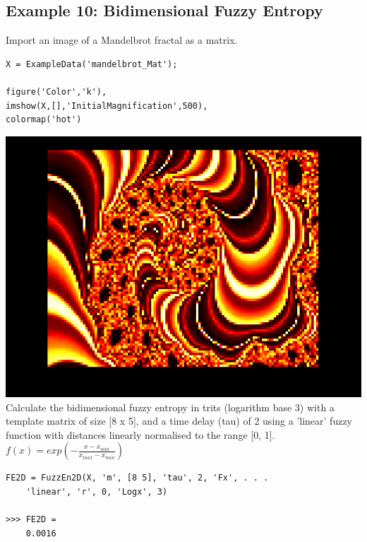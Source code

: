 \documentclass[12pt, a4paper, titlepage, openany]{book}
\begin{document}
\subsection{\normalsize Example 10: \hspace{15mm} Bidimensional Fuzzy Entropy}
\noindent Import an image of a Mandelbrot fractal as a matrix.
\begin{verbatim}
X = ExampleData('mandelbrot_Mat');

figure('Color','k'), 
imshow(X,[],'InitialMagnification',500),
colormap('hot')
\end{verbatim}
\includegraphics[scale=.4]{mandelbrot.png}\newline \newline
Calculate the bidimensional fuzzy entropy in trits (logarithm base 3) with a template matrix of size [8 x 5], and a time delay (tau) of 2  using a 'linear' fuzzy function with distances linearly normalised to the range [0, 1].
\newline 	$f(x) = exp(-\frac{x - x_{min}}{x_{max} - x_{min}}) $
\begin{verbatim}
FE2D = FuzzEn2D(X, 'm', [8 5], 'tau', 2, 'Fx', . . .
	'linear', 'r', 0, 'Logx', 3)

>>> FE2D = 
	0.0016
\end{verbatim}






\end{document}
